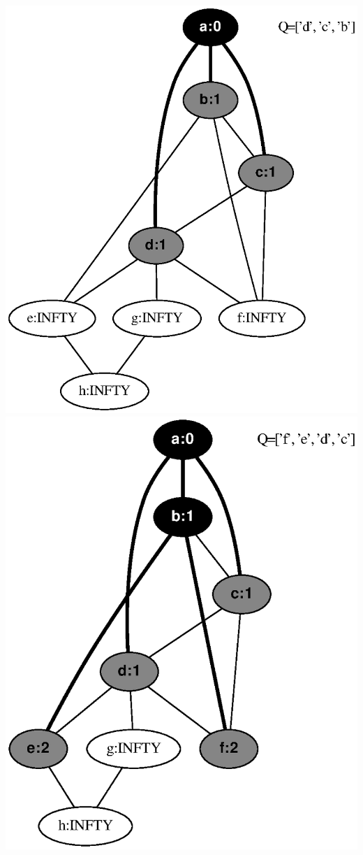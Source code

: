 \documentclass{article}
\begin{document}
\includegraphics[height=.3\textheight]{bfs_undirected_classroom_key_01.eps}
\vspace{1em}
\includegraphics[height=.3\textheight]{bfs_undirected_classroom_key_02.eps}
\vspace{1em}
\end{document}
